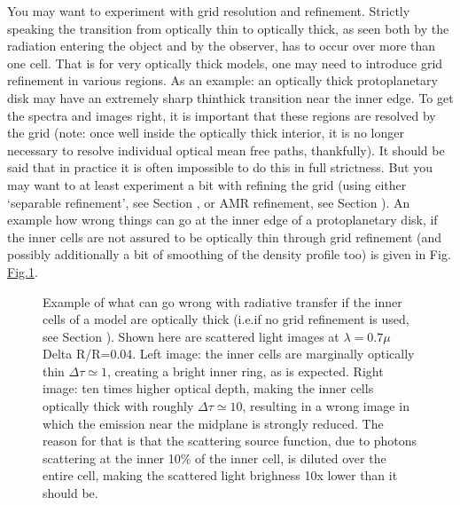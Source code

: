 \documentclass[letterpaper,10pt,english]{sphinxmanual}
\begin{document}
\begin{enumerate}
You may want to experiment with grid resolution and refinement. Strictly
speaking the transition from optically thin to optically thick, as seen both
by the radiation entering the object and by the observer, has to occur over
more than one cell. That is for very optically thick models, one may need to
introduce grid refinement in various regions. As an example: an optically
thick protoplanetary disk may have an extremely sharp thin\sphinxhyphen{}thick transition
near the inner edge. To get the spectra and images right, it is important
that these regions are resolved by the grid (note: once well inside the
optically thick interior, it is no longer necessary to resolve individual
optical mean free paths, thankfully). It should be said that in practice it
is often impossible to do this in full strictness. But you may want to at
least experiment a bit with refining the grid (using either ‘separable
refinement’, see Section {\hyperref[\detokenize{gridding:sec-separable-refinement}]{}}, or AMR refinement,
see Section {\hyperref[\detokenize{inputoutputfiles:sec-amr-grid-oct-tree}]{}}). An example how wrong things can go
at the inner edge of a protoplanetary disk, if the inner cells are not
assured to be optically thin through grid refinement (and possibly
additionally a bit of smoothing of the density profile too) is given in
Fig. \hyperref[\detokenize{tipsandtricks:fig-innerrim-lowres}]{Fig.\@ \ref{\detokenize{tipsandtricks:fig-innerrim-lowres}}}.

\begin{figure}[htbp]
\centering
\capstart

\noindent{}
\caption{Example of what can go wrong with radiative transfer if the inner cells of
a model are optically thick (i.e.if no grid refinement is used, see
Section {\hyperref[\detokenize{gridding:sec-separable-refinement}]{}}). Shown here are scattered light
images at \(\lambda=0.7\mu\)Delta R/R=0.04\textasciigrave{}.  Left image: the
inner cells are marginally optically thin \(\Delta\tau\simeq 1\),
creating a bright inner ring, as is expected. Right image: ten times
higher optical depth, making the inner cells optically thick with roughly
\(\Delta\tau\simeq 10\), resulting in a wrong image in which the
emission near the midplane is strongly reduced.  The reason for that is
that the scattering source function, due to photons scattering at the
inner 10\% of the inner cell, is diluted over the entire cell, making the
scattered light brighness 10x lower than it should be.}\label{\detokenize{tipsandtricks:id1}}\label{\detokenize{tipsandtricks:fig-innerrim-lowres}}\end{figure}


\end{enumerate}
\end{document}
